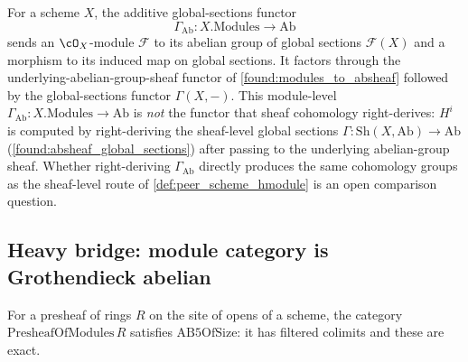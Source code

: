\begin{definition}
  \leanok
  \label{found:global_sections_ab}
  For a scheme \(X\), the additive global-sections functor
  \[
    \Gamma_{\mathrm{Ab}}:X.\mathrm{Modules}\to\mathrm{Ab}
  \]
  sends an \(\cO_X\)-module \(\mathcal F\) to its abelian group of global
  sections \(\mathcal F(X)\) and a morphism to its induced map on global
  sections.  It factors through the underlying-abelian-group-sheaf functor of
  \cref{found:modules_to_absheaf} followed by the global-sections functor
  \(\Gamma(X,-)\).  This module-level \(\Gamma_{\mathrm{Ab}}:X.\mathrm{Modules}\to
  \mathrm{Ab}\) is \emph{not} the functor that sheaf cohomology right-derives:
  \(H^i\) is computed by right-deriving the sheaf-level global sections
  \(\Gamma:\mathrm{Sh}(X,\mathrm{Ab})\to\mathrm{Ab}\)
  (\cref{found:absheaf_global_sections}) after passing to the underlying
  abelian-group sheaf.  Whether right-deriving \(\Gamma_{\mathrm{Ab}}\)
  directly produces the same cohomology groups as the sheaf-level route of
  \cref{def:peer_scheme_hmodule} is an open comparison question.
\end{definition}

\subsection{Heavy bridge: module category is Grothendieck abelian}

\begin{lemma}
  \label{found:presheafmod_ab5}
  For a presheaf of rings \(R\) on the site of opens of a scheme, the category
  \(\mathrm{PresheafOfModules}\,R\) satisfies \(\mathrm{AB5OfSize}\): it has
  filtered colimits and these are exact.
\end{lemma}

